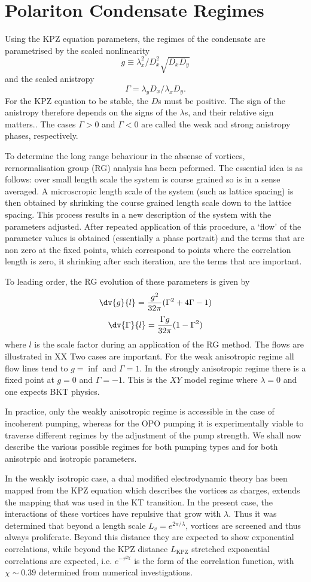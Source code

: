 \section{Polariton Condensate Regimes}

Using the KPZ equation parameters, the regimes of the condensate are parametrised by the scaled nonlinearity \[
g \equiv \lambda_x^2/D_x^2\sqrt{D_xD_y}
\]
and the scaled anistropy
\[
\Gamma = \lambda_y D_x/\lambda_x D_y.
\]
For the KPZ equation to be stable, the $D$s must be positive. The sign of the anistropy therefore depends on the signs of the $\lambda$s, and their relative sign matters.. The cases $\Gamma > 0$ and $\Gamma <0$ are called the weak and strong anistropy phases, respectively. 

To determine the long range behaviour in the absense of vortices, rernormalisation group (RG) analysis has been peformed. The essential idea is as follows: over small length scale the system is course grained so is in a sense averaged. A microscropic length scale of the system (such as lattice spacing) is then obtained by shrinking the course grained length scale down to the lattice spacing. This process results in a new description of the system with the parameters adjusted. After repeated application of this procedure, a `flow' of the parameter values is obtained (essentially a phase portrait) and the terms that are non zero at the fixed points, which correspond to points where the correlation length is zero, it shrinking after each iteration, are the terms that are important. 

To leading order, the RG evolution of these parameters is given by 
\[
\dv{g}{l} = \frac{g^2}{32\pi}(\Gamma^2 + 4\Gamma-1)
\]
\[
\dv{\Gamma}{l} = \frac{\Gamma g}{32 \pi}(1-\Gamma^2)
\]
where $l$ is the scale factor during an application of the RG method. The flows are illustrated in XX  Two cases are important. For the weak anisotropic regime all flow lines tend to $g=\inf$ and $\Gamma=1$. In the strongly anisotropic regime there is a fixed point at $g=0$ and $\Gamma=-1$. This is the $XY$ model regime where $\lambda=0$ and one expects BKT physics. 

In practice, only the weakly anisotropic regime is accessible in the case of incoherent pumping, whereas for the OPO pumping it is experimentally viable to traverse different regimes by the adjustment of the pump strength. We shall now describe the various possible regimes for both pumping types and for both anisotrpic and isotropic parameters. 

In the weakly isotropic case, a dual modified electrodynamic theory has been mapped from the KPZ equation which describes the vortices as charges, extends the mapping that was used in the KT transition. In the present case, the interactions of these vortices have repulsive that grow with $\lambda$. Thus it was determined that beyond a length scale $L_v = e^{2\pi/\lambda}$, vortices are screened and thus always proliferate. Beyond this distance they are expected to show exponential correlations, while beyond the KPZ distance $L_{\text{KPZ}}$ stretched exponential correlations are expected, i.e. $e^{-r^{2\chi}}$ is the form of the correlation function, with $\chi \sim 0.39$ determined from numerical investigations.

